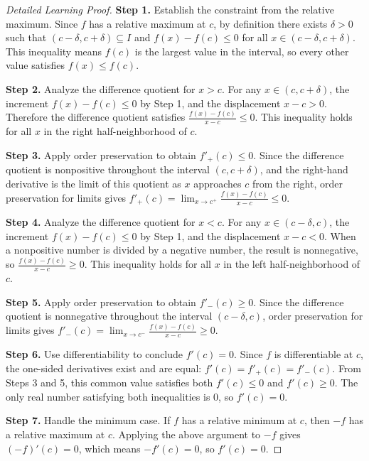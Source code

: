 \begin{proof}[Detailed Learning Proof]
\LRAProofBodyStart

\textbf{Step 1.} Establish the constraint from the relative maximum. Since $f$ has a relative maximum at $c$, by definition there exists $\delta > 0$ such that $(c - \delta, c + \delta) \subseteq I$ and $f(x) - f(c) \leq 0$ for all $x \in (c - \delta, c + \delta)$. This inequality means $f(c)$ is the largest value in the interval, so every other value satisfies $f(x) \leq f(c)$.

\textbf{Step 2.} Analyze the difference quotient for $x > c$. For any $x \in (c, c + \delta)$, the increment $f(x) - f(c) \leq 0$ by Step 1, and the displacement $x - c > 0$. Therefore the difference quotient satisfies $\frac{f(x) - f(c)}{x - c} \leq 0$. This inequality holds for all $x$ in the right half-neighborhood of $c$.

\textbf{Step 3.} Apply order preservation to obtain $f'_+(c) \leq 0$. Since the difference quotient is nonpositive throughout the interval $(c, c + \delta)$, and the right-hand derivative is the limit of this quotient as $x$ approaches $c$ from the right, order preservation for limits gives $f'_+(c) = \lim_{x \to c^+} \frac{f(x) - f(c)}{x - c} \leq 0$.

\textbf{Step 4.} Analyze the difference quotient for $x < c$. For any $x \in (c - \delta, c)$, the increment $f(x) - f(c) \leq 0$ by Step 1, and the displacement $x - c < 0$. When a nonpositive number is divided by a negative number, the result is nonnegative, so $\frac{f(x) - f(c)}{x - c} \geq 0$. This inequality holds for all $x$ in the left half-neighborhood of $c$.

\textbf{Step 5.} Apply order preservation to obtain $f'_-(c) \geq 0$. Since the difference quotient is nonnegative throughout the interval $(c - \delta, c)$, order preservation for limits gives $f'_-(c) = \lim_{x \to c^-} \frac{f(x) - f(c)}{x - c} \geq 0$.

\textbf{Step 6.} Use differentiability to conclude $f'(c) = 0$. Since $f$ is differentiable at $c$, the one-sided derivatives exist and are equal: $f'(c) = f'_+(c) = f'_-(c)$. From Steps 3 and 5, this common value satisfies both $f'(c) \leq 0$ and $f'(c) \geq 0$. The only real number satisfying both inequalities is $0$, so $f'(c) = 0$.

\textbf{Step 7.} Handle the minimum case. If $f$ has a relative minimum at $c$, then $-f$ has a relative maximum at $c$. Applying the above argument to $-f$ gives $(-f)'(c) = 0$, which means $-f'(c) = 0$, so $f'(c) = 0$.
\end{proof}

